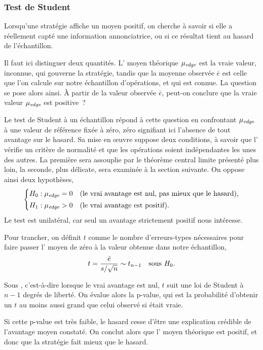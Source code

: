 \subsubsection*{Test de Student}

Lorsqu'une stratégie affiche un \edgevar{} moyen positif, on cherche à savoir
si elle a réellement capté une information annonciatrice, ou si ce résultat
tient au hasard de l'échantillon.

Il faut ici distinguer deux quantités. L'\edgevar{} moyen théorique
\(\mu_{\textit{edge}}\) est la vraie valeur, inconnue, qui gouverne la stratégie,
tandis que la moyenne observée \(\bar e\) est celle que l'on calcule sur notre
échantillon d'opérations, et qui est connue. La question se pose alors ainsi.
À partir de la valeur observée \(\bar e\), peut-on conclure que la vraie
valeur \(\mu_{\textit{edge}}\) est positive~?

Le test de Student à un échantillon répond à cette question en confrontant
\(\mu_{\textit{edge}}\) à une valeur de référence fixée à zéro, zéro signifiant
ici l'absence de tout avantage sur le hasard. Sa mise en \oe uvre suppose deux
conditions, à savoir que l'\edgevar{} vérifie un critère de normalité et que
les opérations soient indépendantes les unes des autres. La première sera
assouplie par le théorème central limite présenté plus loin, la seconde, plus
délicate, sera examinée à la section suivante. On oppose ainsi deux
hypothèses,
\[
  \begin{cases}
    H_0 : \mu_{\textit{edge}} = 0 & \text{(le vrai avantage est nul, pas mieux que le hasard),}\\[2pt]
    H_1 : \mu_{\textit{edge}} > 0 & \text{(le vrai avantage est positif).}
  \end{cases}
\]
Le test est unilatéral, car seul un avantage strictement positif nous
intéresse.

Pour trancher, on définit \(t\) comme le nombre d'erreurs-types nécessaires
pour faire passer l'\edgevar{} moyen de zéro à la valeur obtenue dans notre
échantillon,
\[
  t = \frac{\bar e}{s/\sqrt{n}} \sim t_{n-1} \quad\text{sous } H_0 .
\]

Sous \Hzero{}, c'est-à-dire lorsque le vrai avantage est nul, \(t\) suit une
loi de Student à \(n-1\) degrés de liberté. On évalue alors la p-value, qui
est la probabilité d'obtenir un \(t\) au moins aussi grand que celui observé
si \Hzero{} était vraie.

Si cette p-value est très faible, le hasard cesse d'être une explication
crédible de l'avantage moyen constaté. On conclut alors que l'\edgevar{}
moyen théorique est positif, et donc que la stratégie fait mieux que le
hasard.

